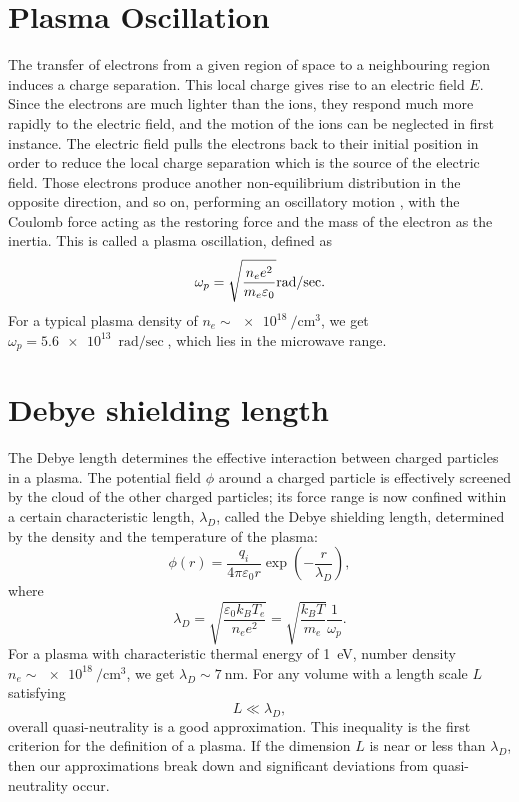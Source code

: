 \documentclass[justified,nofonts,nobib]{tufte-book}
\begin{document}
\section{Plasma Oscillation}\label{sec:oscillation}
The transfer of electrons from a given region of space to a neighbouring region induces a charge separation. This local charge gives rise to an electric field $E$. Since the electrons are much lighter than the ions, they respond much more rapidly to the electric field, and the motion of the ions can be neglected in first instance. The electric field pulls the electrons back to their initial position in order to reduce the local charge separation which is the source of the electric field. Those electrons produce another non-equilibrium distribution in the opposite direction, and so on, performing an oscillatory motion , with the Coulomb force acting as the restoring force and the mass of the electron as the inertia. This is called a plasma oscillation, defined as
\begin{equation}
		\omega_p=\sqrt{\frac{n_e e^2}{m_e \varepsilon_0}}\si[per-mode=fraction]{\radian\per\sec}.\label{eq:plasma-frequency}
\end{equation}
For a typical plasma density of $n_e \sim \SI{e18}{\per\cubic\cm}$, we get $\omega_p=\SI{5.6e13}{\radian\per\sec}$, which lies in the microwave range.

\section{Debye shielding length}\label{sec:debye}
The Debye length determines the effective interaction between charged particles in a plasma. The potential field $\phi$ around a charged particle is effectively screened by the cloud of the other charged particles; its force range is now confined within a certain characteristic length, $\lambda_D$, called the Debye shielding length, determined by the density and the temperature of the plasma:
\begin{equation}
\phi(r)=\frac{q_i}{4\pi\varepsilon_0 r}\exp{\left(-\frac{r}{\lambda_D}\right)},
\end{equation}
where
\begin{equation}
\lambda_D=\sqrt{\frac{\varepsilon_0 k_B T_e}{n_e e^2}}=\sqrt{\frac{k_B T}{m_e}}\frac{1}{\omega_p}.
\end{equation}
For a plasma with characteristic thermal energy of \SI{1}{\electronvolt}, number density $n_e \sim \SI{e18}{\per\cubic\cm}$, we get $\lambda_D \sim \SI{7}{\nm}$.
For any volume with a length scale $L$ satisfying 
\begin{equation}
L \ll \lambda_D,
\end{equation}
overall quasi-neutrality is a good approximation. This inequality is the first criterion for the definition of a plasma. If the dimension $L$ is near or less than $\lambda_D$, then our approximations break down and significant deviations from quasi-neutrality occur.
\end{document}
